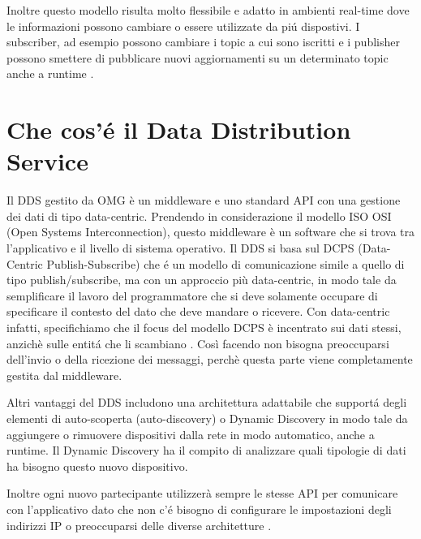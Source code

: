 Inoltre questo modello risulta molto
flessibile e adatto in ambienti real-time dove le informazioni
possono cambiare o essere utilizzate da piú dispostivi.
I subscriber, ad esempio possono cambiare i topic a cui 
sono iscritti e i publisher possono smettere di pubblicare nuovi
aggiornamenti su un determinato topic anche a runtime \cite{OH2010318}.

\section{Che cos'é il Data Distribution Service}

Il DDS gestito da OMG è un middleware e uno standard API con una gestione
dei dati di tipo data-centric. 
Prendendo in considerazione il modello ISO OSI 
(Open Systems Interconnection), questo
middleware è un software che si trova tra l'applicativo e il livello
di sistema operativo.
Il DDS si basa sul DCPS (Data-Centric Publish-Subscribe) 
che é un modello di comunicazione simile a quello
di tipo publish/subscribe, ma con un approccio più data-centric, in modo
tale da semplificare il lavoro del programmatore che si deve solamente
occupare di specificare il contesto del dato che deve mandare o ricevere.
Con data-centric infatti, specifichiamo che il focus del modello DCPS 
è incentrato 
sui dati stessi, anzichè sulle entitá che li scambiano \cite{whatisdds}.
Così facendo non bisogna preoccuparsi dell'invio o della ricezione
dei messaggi, perchè questa parte viene completamente gestita dal middleware.


Altri vantaggi del DDS includono una architettura adattabile che supportá
degli elementi di auto-scoperta (auto-discovery) o Dynamic Discovery 
in modo tale da aggiungere o 
rimuovere dispositivi dalla rete in modo automatico, anche a runtime.
Il Dynamic Discovery ha il compito di analizzare quali tipologie di dati 
ha bisogno questo nuovo dispositivo. 

Inoltre ogni nuovo partecipante 
utilizzerà sempre le stesse API per comunicare con l'applicativo dato che 
non c'é bisogno di configurare le impostazioni degli indirizzi IP o 
preoccuparsi delle diverse architetture \cite{1494965}.
 
